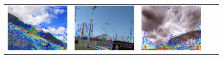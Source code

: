 \begin{figure}
\begin{tabular}{@{}c@{}c@{}c@{}c@{}c@{}}
\includegraphics[width=\sgbpwidth\linewidth]{figures/nn_analysis/sgbp/pano_addgasjevqjafh_jpg-1.png} &
\includegraphics[width=\sgbpwidth\linewidth]{figures/nn_analysis/sgbp/pano_ayfwzaseviqbww_jpg-2.png} &
\includegraphics[width=\sgbpwidth\linewidth]{figures/nn_analysis/sgbp/pano_addtfngrqwwyvb_jpg-6.png} \\

\end{tabular}
\end{figure}
